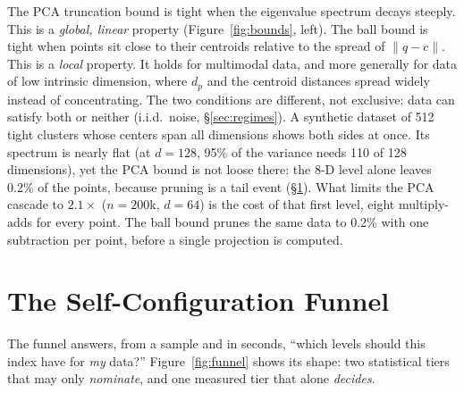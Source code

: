 \documentclass[sigconf, nonacm]{acmart}
\begin{document}
The PCA truncation bound is tight when the eigenvalue spectrum decays
steeply. This is a \emph{global, linear} property
(Figure~\ref{fig:bounds}, left). The ball bound is tight when points sit
close to their centroids relative to the spread of
$\lVert q - c \rVert$. This is a \emph{local} property. It holds for
multimodal data, and more generally for data of low intrinsic dimension,
where $d_p$ and the centroid distances spread widely instead of
concentrating. The two conditions are different, not exclusive: data can
satisfy both or neither (i.i.d.\ noise, \S\ref{sec:regimes}). A synthetic
dataset of 512 tight clusters whose centers span all dimensions shows
both sides at once. Its spectrum is nearly flat (at $d=128$, 95\% of the
variance needs 110 of 128 dimensions), yet the PCA bound is not loose
there: the 8-D level alone leaves 0.2\% of the points, because pruning is
a tail event (\S\ref{sec:funnel}). What limits the PCA cascade to
$2.1\times$ ($n=200$k, $d=64$) is the cost of that first level, eight
multiply-adds for every point. The ball bound prunes the same data to
0.2\% with one subtraction per point, before a single projection is
computed.

\section{The Self-Configuration Funnel}
\label{sec:funnel}

The funnel answers, from a sample and in seconds, ``which levels should this
index have for \emph{my} data?'' Figure~\ref{fig:funnel} shows its shape:
two statistical tiers that may only \emph{nominate}, and one measured tier
that alone \emph{decides}.
\end{document}

